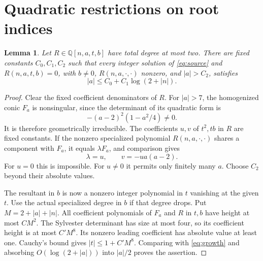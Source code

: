\documentclass[11pt,a4paper]{article}
\newtheorem{lemma}[theorem]{Lemma}
\newcommand{\Q}{\mathbb Q}\newcommand{\Z}{\mathbb Z}
\begin{document}
\section{Quadratic restrictions on root indices}

\begin{lemma}\label{lem:bounded}
Let $R\in\Q[n,a,t,b]$ have total degree at most two.
There are fixed constants $C_0,C_1,C_2$ such that every integer
solution of \eqref{eq:source} and $R(n,a,t,b)=0$, with $b\ne0$,
$R(n,a,\cdot,\cdot)$ nonzero, and $|a|>C_2$, satisfies
\[
                       |a|\le C_0+C_1\log(2+|n|).
\]
\end{lemma}
\begin{proof}
Clear the fixed coefficient denominators of $R$.
For $|a|>7$, the homogenized conic $F_a$ is nonsingular, since
the determinant of its quadratic form is
\[
                   -(a-2)^2(1-a^2/4)\ne0.
\]
It is therefore geometrically irreducible. The coefficients $u,v$
of $t^2,tb$ in $R$ are fixed constants. If the nonzero specialized
polynomial $R(n,a,\cdot,\cdot)$ shares a component with $F_a$,
it equals $\lambda F_a$, and comparison gives
\[
                       \lambda=u,\qquad v=-u a(a-2).
\]
For $u=0$ this is impossible. For $u\ne0$ it permits only finitely
many $a$. Choose $C_2$ beyond their absolute values.

The resultant in $b$ is now a nonzero integer polynomial in $t$
vanishing at the given $t$. Use the actual specialized degree in
$b$ if that degree drops. Put $M=2+|a|+|n|$. All coefficient
polynomials of $F_a$ and $R$ in $t,b$ have height at most $CM^2$.
The Sylvester determinant has size at most four, so its coefficient
height is at most $C'M^8$. Its nonzero leading coefficient has
absolute value at least one. Cauchy's bound gives
$|t|\le1+C'M^8$. Comparing with \eqref{eq:growth} and absorbing
$O(\log(2+|a|))$ into $|a|/2$ proves the assertion.
\end{proof}
\end{document}
